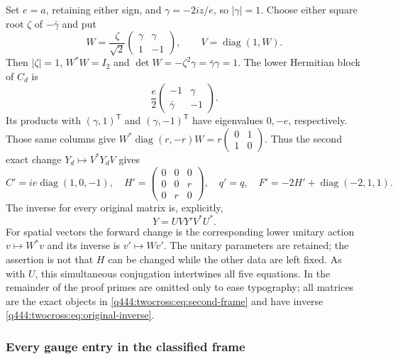 Set $e=a$, retaining either sign, and $\gamma=-2iz/e$, so
$|\gamma|=1$. Choose either square root $\zeta$ of $-\bar\gamma$ and put
\[
W=\frac{\zeta}{\sqrt2}
\begin{pmatrix}\gamma&\gamma\\1&-1\end{pmatrix},\qquad
V=\operatorname{diag}(1,W).
\]
Then $|\zeta|=1$, $W^*W=I_2$ and
$\det W=-\zeta^2\gamma=\bar\gamma\gamma=1$.
The lower Hermitian block of $C_d$ is
\[
\frac e2\begin{pmatrix}-1&\gamma\\\bar\gamma&-1\end{pmatrix}.
\]
Its products with $(\gamma,1)^{\mathsf T}$ and
$(\gamma,-1)^{\mathsf T}$ have eigenvalues $0,-e$, respectively.
Those same columns give
$W^*\operatorname{diag}(r,-r)W=r\left(\begin{smallmatrix}0&1\\1&0\end{smallmatrix}\right)$.
Thus the second exact change $Y_d\mapsto V^*Y_dV$ gives
\begin{equation}
C'=ie\operatorname{diag}(1,0,-1),\quad
H'=\begin{pmatrix}0&0&0\\0&0&r\\0&r&0\end{pmatrix},\quad q'=q,
\quad F'=-2H'+\operatorname{diag}(-2,1,1).
\label{q444:twocross:eq:second-frame}
\end{equation}
The inverse for every original matrix is, explicitly,
\begin{equation}
Y=UVY'V^*U^*.
\label{q444:twocross:eq:original-inverse}
\end{equation}
For spatial vectors the forward change is the corresponding lower
unitary action $v\mapsto W^*v$ and its inverse is $v'\mapsto Wv'$.
The unitary parameters are retained; the assertion is not that $H$ can
be changed while the other data are left fixed. As with $U$, this
simultaneous conjugation intertwines all five equations. In the remainder
of the proof primes are omitted only to ease typography; all matrices
are the exact objects in \eqref{q444:twocross:eq:second-frame} and have inverse
\eqref{q444:twocross:eq:original-inverse}.

\subsubsection{Every gauge entry in the classified frame}
\label{q444:twocross:full-gauge-entries}

